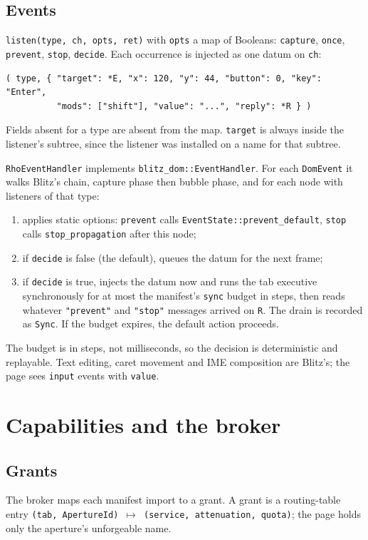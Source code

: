 \documentclass[11pt]{article}
\theoremstyle{definition}
\theoremstyle{remark}
\newcommand{\code}[1]{\texttt{#1}}
\begin{document}
\subsection{Events}\label{sec:events}

\code{listen(type, ch, opts, ret)} with \code{opts} a map of Booleans:
\code{capture}, \code{once}, \code{prevent}, \code{stop}, \code{decide}.
Each occurrence is injected as one datum on \code{ch}:
\begin{lstlisting}
( type, { "target": *E, "x": 120, "y": 44, "button": 0, "key": "Enter",
          "mods": ["shift"], "value": "...", "reply": *R } )
\end{lstlisting}
Fields absent for a type are absent from the map. \code{target} is always inside
the listener's subtree, since the listener was installed on a name for that subtree.

\code{RhoEventHandler} implements \code{blitz\_dom::EventHandler}. For each
\code{DomEvent} it walks Blitz's chain, capture phase then bubble phase, and for
each node with listeners of that type:
\begin{enumerate}[nosep]
\item applies static options: \code{prevent} calls \code{EventState::prevent\_default},
  \code{stop} calls \code{stop\_propagation} after this node;
\item if \code{decide} is false (the default), queues the datum for the next frame;
\item if \code{decide} is true, injects the datum now and runs the tab executive
  synchronously for at most the manifest's \code{sync} budget in steps, then reads
  whatever \code{"prevent"} and \code{"stop"} messages arrived on \code{R}. The drain
  is recorded as \code{Sync}. If the budget expires, the default action proceeds.
\end{enumerate}
The budget is in steps, not milliseconds, so the decision is deterministic and
replayable. Text editing, caret movement and IME composition are Blitz's; the page
sees \code{input} events with \code{value}.
\section{Capabilities and the broker}\label{sec:broker}

\subsection{Grants}
The broker maps each manifest import to a grant. A grant is a routing-table entry
\code{(tab, ApertureId) $\mapsto$ (service, attenuation, quota)}; the page holds only
the aperture's unforgeable name.
\end{document}
